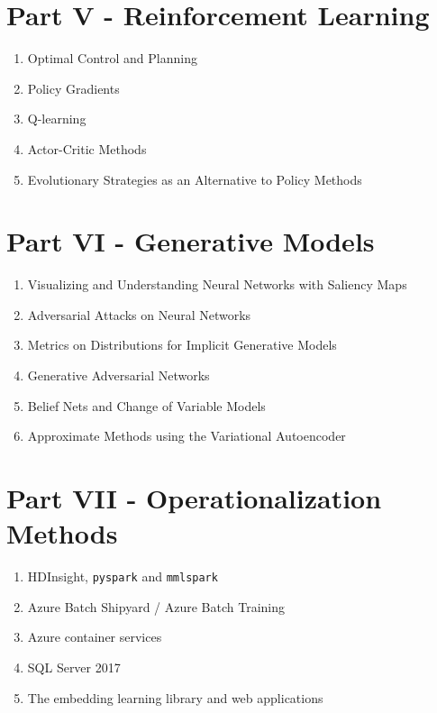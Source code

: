 \documentclass[]{book}
\providecommand{\tightlist}{%
  \setlength{\itemsep}{0pt}\setlength{\parskip}{0pt}}
\theoremstyle{definition}
\theoremstyle{definition}
\theoremstyle{definition}
\theoremstyle{remark}
\begin{document}
\section{Part V - Reinforcement
Learning}\label{part-v---reinforcement-learning}

\begin{enumerate}
\def\labelenumi{\arabic{enumi}.}
\tightlist
\item
  Optimal Control and Planning
\item
  Policy Gradients
\item
  Q-learning
\item
  Actor-Critic Methods
\item
  Evolutionary Strategies as an Alternative to Policy Methods
\end{enumerate}

\section{Part VI - Generative Models}\label{part-vi---generative-models}

\begin{enumerate}
\def\labelenumi{\arabic{enumi}.}
\tightlist
\item
  Visualizing and Understanding Neural Networks with Saliency Maps
\item
  Adversarial Attacks on Neural Networks
\item
  Metrics on Distributions for Implicit Generative Models
\item
  Generative Adversarial Networks
\item
  Belief Nets and Change of Variable Models
\item
  Approximate Methods using the Variational Autoencoder
\end{enumerate}

\section{Part VII - Operationalization
Methods}\label{part-vii---operationalization-methods}

\begin{enumerate}
\def\labelenumi{\arabic{enumi}.}
\tightlist
\item
  HDInsight, \texttt{pyspark} and \texttt{mmlspark}
\item
  Azure Batch Shipyard / Azure Batch Training
\item
  Azure container services
\item
  SQL Server 2017
\item
  The embedding learning library and web applications
\end{enumerate}
\end{document}
